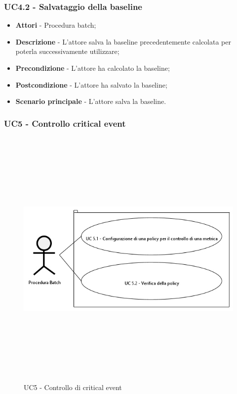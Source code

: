                 \subsubsection{UC4.2 - Salvataggio della baseline}

                    \begin{itemize}

                        \item \textbf{Attori} - Procedura batch;
                        \item \textbf{Descrizione} - L'attore salva la baseline precedentemente calcolata per poterla
                        successivamente utilizzare;
                        \item \textbf{Precondizione} - L'attore ha calcolato la baseline;
                        \item \textbf{Postcondizione} - L'attore ha salvato la baseline;
                        \item \textbf{Scenario principale} - L'attore salva la baseline.

                \end{itemize}

\newpage

            \subsubsection{UC5 - Controllo critical event}

                \begin{figure}[H]
                    \centering
                    \includegraphics[width=13cm,height=13cm,keepaspectratio]{./images/UC5.png}
                    \caption{UC5 - Controllo di critical event}
                \end{figure}

